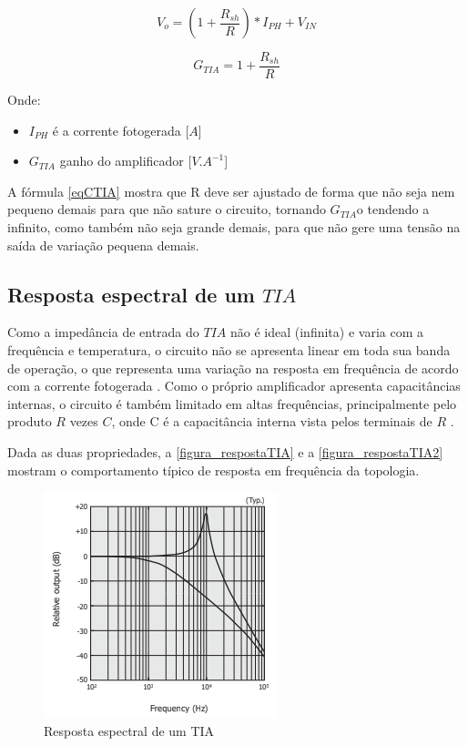 \begin{equation}
    \label{eqCTIA}
    V_o = (1+\frac{R_{sh}}{R})*I_{PH} + V_{IN}
\end{equation}

\begin{equation}
    \label{gainCTIA}
    G_{TIA} = 1+\frac{R_{sh}}{R}
\end{equation}

Onde:
\begin{itemize}
    \item $I_{PH}$ \'e a corrente fotogerada [$A$]
    \item $G_{TIA}$ ganho do amplificador [$V.A^{-1}$]
\end{itemize}

A f\'ormula \ref{eqCTIA} mostra que R deve ser ajustado de forma que n\~ao seja nem pequeno demais para que n\~ao sature o circuito, tornando $G_{TIA}$o tendendo a infinito, como também n\~ao seja grande demais, para que n\~ao gere uma tens\~ao na sa\'ida de varia{\c c}\~ao pequena demais.

\subsection{Resposta espectral de um $TIA$}

Como a imped\^ancia de entrada do $TIA$ n\~ao \'e ideal (infinita) e varia com a frequ\^encia e temperatura, o circuito n\~ao se apresenta linear em toda sua banda de opera{\c c}\~ao, o que representa uma varia{\c c}\~ao na resposta em frequ\^encia de acordo com a corrente fotogerada \cite{hamamatsu}.
Como o pr\'oprio amplificador apresenta capacit\^ancias internas, o circuito \'e tamb\'em limitado em altas frequ\^encias, principalmente pelo produto $R$ vezes $C$, onde C \'e a capacit\^ancia interna vista pelos terminais de $R$ \cite{hamamatsu}.

Dada as duas propriedades, a \autoref{figura_respostaTIA} e a \autoref{figura_respostaTIA2} mostram o comportamento t\'ipico de resposta em frequ\^encia da topologia.

\begin{figure}[htb]
	\caption{\label{figura_respostaTIA}Resposta espectral de um TIA}
	\begin{center}
	    \includegraphics[scale=1]{Imagens/RespostaEspectralTIA.png}
	\end{center}
\end{figure}

